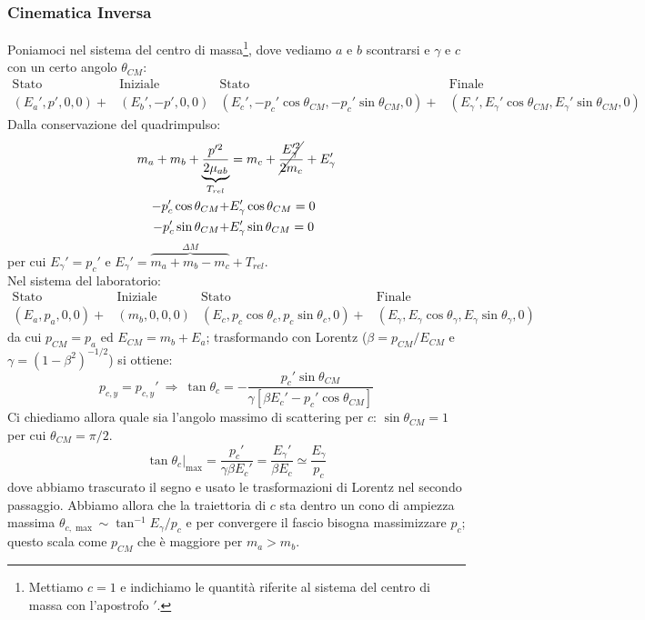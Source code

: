 \subsubsection{Cinematica Inversa} 
Poniamoci nel sistema del centro di massa\footnote{Mettiamo $c=1$ e indichiamo le quantità riferite al sistema del centro di massa con l'apostrofo $'$.}, dove vediamo $a$ e $b$ scontrarsi e $\gamma$ e $c$  con un certo angolo $\theta_{CM}$:
\begin{align*}
	\text{Stato  }&\text{Iniziale} & \text{Stato  }&\text{Finale} \\
	(E_a',p',0,0) +&(E_b',-p',0,0) & (E_c',-p_c'\cos{\theta_{CM}},-p_c'\sin{\theta_{CM},0}) +&(E_\gamma',E_\gamma'\cos{\theta_{CM}},E_\gamma'\sin{\theta_{CM}},0) 
\end{align*}
Dalla conservazione del quadrimpulso:
\begin{align*}
	m_a+m_b + \underbrace{\frac{p'^{2}}{2\mu_{ab}}}_{T_{rel}} &= m_c + \cancel{\frac{E_\gamma'^2}{2m_c}}+E_\gamma' \\ 
	-p_c'\cos{\theta_{CM}} +& E_\gamma' \cos{\theta_{CM}} = 0\\
	-p_c'\sin{\theta_{CM}} +& E_\gamma' \sin{\theta_{CM}} = 0
\end{align*}
per cui $E_\gamma' = p_c'$ e $E_\gamma' = \overbrace{m_a+m_b-m_c}^{\Delta M} + T_{rel}$.\\ 
Nel sistema del laboratorio:
\begin{align*}
	\text{Stato  }&\text{Iniziale} & \text{Stato  }&\text{Finale} \\
	(E_a,p_a,0,0) +&(m_b,0,0,0) & (E_c,p_c\cos{\theta_{c}},p_c\sin{\theta_{c},0}) +&(E_\gamma,E_\gamma\cos{\theta_{\gamma}},E_\gamma\sin{\theta_{\gamma}},0) 
\end{align*}
da cui $p_{CM} =p_a$ ed $E_{CM} = m_b + E_a$; trasformando con Lorentz ($\beta = p_{CM}/E_{CM}$ e $\gamma = (1-\beta^2)^{-1/2}$) si ottiene:
$$p_{c,y} = p_{c,y}' \:\Rightarrow\: \tan{\theta_c} = -\frac{p_c' \sin{\theta_{CM}}}{\gamma [\beta E_c' -p_c'\cos{\theta_{CM}}]}$$
Ci chiediamo allora quale sia l'angolo massimo di scattering per $c$: $\sin{\theta_{CM}}=1$ per cui $\theta_{CM} = \pi/2$.
$$\tan{\theta_c}|_{\max{}} = \frac{p_c'}{\gamma\beta E_c'} = \frac{E_\gamma'}{\beta E_c}\simeq \frac{E_\gamma}{p_c} $$
dove abbiamo trascurato il segno e usato le trasformazioni di Lorentz nel secondo passaggio. Abbiamo allora che la traiettoria di $c$ sta dentro un cono di ampiezza massima $\theta_{c,\max{}} \sim \tan^{-1}{E_\gamma/p_c}$ e per convergere il fascio bisogna massimizzare $p_c$; questo scala come $p_{CM}$ che è maggiore per $m_a>m_b$.\\
